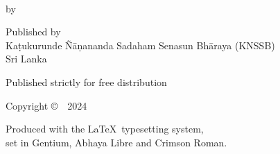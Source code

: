 \cleartoverso
\thispagestyle{empty}

{\copyrightsize
\centering
\setlength{\parindent}{0pt}%
\setlength{\parskip}{0.8\baselineskip}%

\thetitle\\
\thesubtitle

by \theauthor

Published by\\
Kaṭukurunde Ñāṇananda Sadaham Senasun Bhāraya (KNSSB)\\
Sri Lanka

Published strictly for free distribution


Copyright \copyright\ \thePublisher\ 2024


\vfill

{\footnotesize


Produced with the \LaTeX\ typesetting system,\\ set in Gentium, Abhaya Libre and Crimson Roman.

\theEditionInfo

}}
